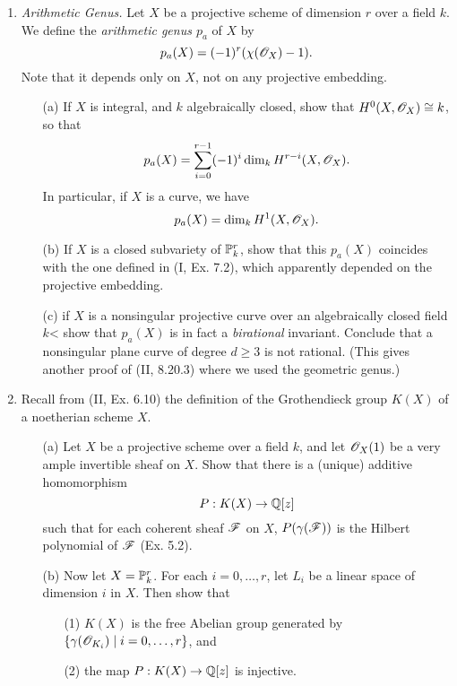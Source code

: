 \documentclass{article}
\begin{document}
\begin{enumerate} [label=\textbf{\arabic*.}, leftmargin=0em]
\item \textit{Arithmetic Genus.} Let $X$ be a projective scheme of dimension $r$ over a field $k$. We define the \textit{arithmetic genus $p_a$} of $X$ by
\begin{equation*}
  p_a(X) = (-1)^r (\chi(\mathscr{O}_X) - 1).
\end{equation*}
Note that it depends only on $X$, not on any projective embedding.
\begin{itemize}
  \item[(a)] If $X$ is integral, and $k$ algebraically closed, show that $H^0(X, \mathscr{O}_X) \cong k$, so that
  \begin{equation*}
    p_a(X) = \sum_{i = 0}^{r - 1} (-1)^i \dim_k{H^{r-i}(X, \mathscr{O}_X)}.
  \end{equation*}
  In particular, if $X$ is a curve, we have
  \begin{equation*}
    p_a(X) = \dim_k{H^1(X, \mathscr{O}_X)}.
  \end{equation*}
  \item[(b)] If $X$ is a closed subvariety of $\mathbb{P}_k^r$, show that this $p_a(X)$ coincides with the one defined in (I, Ex. 7.2), which apparently depended on the projective embedding.
  \item[(c)] if $X$ is a nonsingular projective curve over an algebraically closed field $k$< show that $p_a(X)$ is in fact a \textit{birational} invariant. Conclude that a nonsingular plane curve of degree $d \geq 3$ is not rational. (This gives another proof of (II, 8.20.3) where we used the geometric genus.)
\end{itemize}

\item Recall from (II, Ex. 6.10) the definition of the Grothendieck group $K(X)$ of a noetherian scheme $X$.
\begin{itemize}
  \item[(a)] Let $X$ be a projective scheme over a field $k$, and let $\mathscr{O}_X(1)$ be a very ample invertible sheaf on $X$. Show that there is a (unique) additive homomorphism
  \begin{equation*}
    P : K(X) \to \mathbb{Q}[z]
  \end{equation*}
  such that for each coherent sheaf $\mathscr{F}$ on $X$, $P(\gamma(\mathscr{F}))$ is the Hilbert polynomial of $\mathscr{F}$ (Ex. 5.2).
  \item[(b)] Now let $X = \mathbb{P}_k^r$. For each $i = 0, \dots, r$, let $L_i$ be a linear space of dimension $i$ in $X$. Then show that
  \begin{itemize}
    \item[(1)] $K(X)$ is the free Abelian group generated by $\{ \gamma(\mathscr{O}_{K_i}) \mid i = 0, \dots, r \}$, and
    \item[(2)] the map $P : K(X) \to \mathbb{Q}[z]$ is injective.
  \end{itemize}
\end{itemize}


\end{enumerate}
\end{document}
